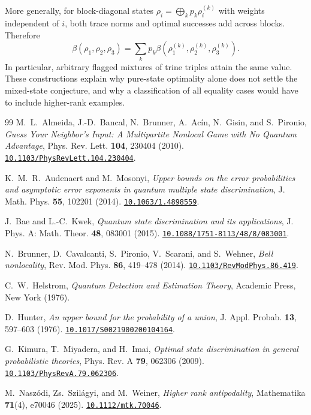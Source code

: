\documentclass[a4paper,11pt,onecolumn,unpublished]{quantumarticle}
\theoremstyle{definition}
\newcommand{\1}{\mathbf 1}
\newcommand{\doi}[1]{\href{https://doi.org/#1}{\nolinkurl{#1}}}
\begin{document}
More generally, for block-diagonal states
$\rho_i=\bigoplus_k p_k\rho_i^{(k)}$ with weights independent of $i$, both
trace norms and optimal successes add across blocks. Therefore
\begin{equation}\label{eq:block-beta}
 \beta(\rho_1,\rho_2,\rho_3)
 =\sum_kp_k\beta(\rho_1^{(k)},\rho_2^{(k)},\rho_3^{(k)}).
\end{equation}
In particular, arbitrary flagged mixtures of trine triples attain the same
value. These constructions explain why pure-state optimality alone does not
settle the mixed-state conjecture, and why a classification of all equality
cases would have to include higher-rank examples.

\begin{thebibliography}{99}
\footnotesize\setlength{\itemsep}{0pt}\setlength{\parsep}{0pt}
M.~L.~Almeida, J.-D.~Bancal, N.~Brunner, A.~Ac\'in, N.~Gisin, and S.~Pironio,
\emph{Guess Your Neighbor's Input: A Multipartite Nonlocal Game with No
Quantum Advantage}, Phys. Rev. Lett. \textbf{104}, 230404 (2010).
\doi{10.1103/PhysRevLett.104.230404}.

K.~M.~R.~Audenaert and M.~Mosonyi,
\emph{Upper bounds on the error probabilities and asymptotic error exponents in
quantum multiple state discrimination},
J. Math. Phys. \textbf{55}, 102201 (2014).
\doi{10.1063/1.4898559}.

J.~Bae and L.-C.~Kwek,
\emph{Quantum state discrimination and its applications},
J. Phys. A: Math. Theor. \textbf{48}, 083001 (2015).
\doi{10.1088/1751-8113/48/8/083001}.

N.~Brunner, D.~Cavalcanti, S.~Pironio, V.~Scarani, and S.~Wehner,
\emph{Bell nonlocality}, Rev. Mod. Phys. \textbf{86}, 419--478 (2014).
\doi{10.1103/RevModPhys.86.419}.

C.~W.~Helstrom, \emph{Quantum Detection and Estimation Theory},
Academic Press, New York (1976).

D.~Hunter, \emph{An upper bound for the probability of a union},
J. Appl. Probab. \textbf{13}, 597--603 (1976).
\doi{10.1017/S0021900200104164}.

G.~Kimura, T.~Miyadera, and H.~Imai,
\emph{Optimal state discrimination in general probabilistic theories},
Phys. Rev. A \textbf{79}, 062306 (2009).
\doi{10.1103/PhysRevA.79.062306}.

M.~Nasz\'odi, Zs.~Szil\'agyi, and M.~Weiner,
\emph{Higher rank antipodality}, Mathematika \textbf{71}(4), e70046 (2025).
\doi{10.1112/mtk.70046}.


\end{thebibliography}
\end{document}
